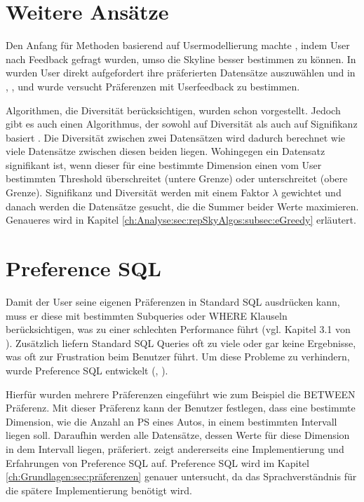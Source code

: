 \section{Weitere Ansätze}
\label{ch:Forschungsstand:sec:userModel}
Den Anfang für Methoden basierend auf Usermodellierung machte \cite{948}, indem User nach Feedback gefragt wurden, umso die Skyline besser bestimmen zu können.
In \cite{Lofi10efficientcomputation} wurden User direkt aufgefordert ihre präferierten Datensätze auszuwählen und in \cite{lee2008optimal}, \cite{Mindolin:2009:DRI:1687627.1687697}, \cite{Mindolin:2011:PEP:1969331.1969354} und \cite{Zhao10callto} wurde versucht Präferenzen mit Userfeedback zu bestimmen.

Algorithmen, die Diversität berücksichtigen, wurden schon vorgestellt. Jedoch gibt es auch einen Algorithmus, der sowohl auf Diversität als auch auf Signifikanz basiert \cite{magnani2014taking}. Die Diversität zwischen zwei Datensätzen wird dadurch berechnet wie viele Datensätze zwischen diesen beiden liegen. Wohingegen ein Datensatz signifikant ist, wenn dieser für eine bestimmte Dimension einen vom User bestimmten Threshold überschreitet (untere Grenze) oder unterschreitet (obere Grenze).
Signifikanz und Diversität werden mit einem Faktor $\lambda$ gewichtet und danach werden die Datensätze gesucht, die die Summer beider Werte maximieren. Genaueres wird in Kapitel \ref{ch:Analyse:sec:repSkyAlgos:subsec:eGreedy} erläutert.
\section{Preference SQL}
\label{ch:Forschungsstand:sec:prefSQL}
Damit der User seine eigenen Präferenzen in Standard SQL ausdrücken kann, muss er diese mit bestimmten Subqueries oder WHERE Klauseln berücksichtigen, was zu einer schlechten Performance führt (vgl. Kapitel 3.1 von \cite{borzsony2001skyline}). Zusätzlich liefern Standard SQL Queries oft zu viele oder gar keine Ergebnisse, was oft zur Frustration beim Benutzer führt. Um diese Probleme zu verhindern, wurde Preference SQL entwickelt (\cite{kiessling2002foundations}, \cite{kiessling2011preference}).

Hierfür wurden mehrere Präferenzen eingeführt wie zum Beispiel die BETWEEN Präferenz. Mit dieser Präferenz kann der Benutzer festlegen, dass eine bestimmte Dimension, wie die Anzahl an PS eines Autos, in einem bestimmten Intervall liegen soll. Daraufhin werden alle Datensätze, dessen Werte für diese Dimension in dem Intervall liegen, präferiert. \cite{kiessling2002preference} zeigt andererseits eine Implementierung und Erfahrungen von Preference SQL auf. 
Preference SQL wird im Kapitel \ref{ch:Grundlagen:sec:präferenzen} genauer untersucht, da das Sprachverständnis für die spätere Implementierung benötigt wird.
